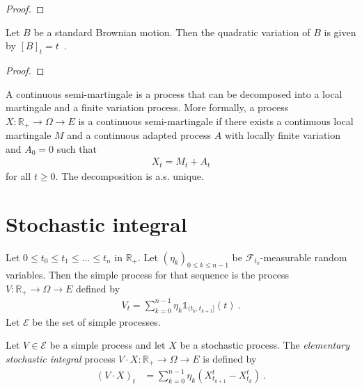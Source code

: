 \begin{proof}

\end{proof}


\begin{lemma}\label{lem:quadraticVariation_brownian}
Let $B$ be a standard Brownian motion. Then the quadratic variation of $B$ is given by $[B]_t = t$~.
\end{lemma}

\begin{proof}

\end{proof}


\begin{definition}\label{def:continuousSemiMartingale}
A continuous semi-martingale is a process that can be decomposed into a local martingale and a finite variation process.
More formally, a process $X : \mathbb{R}_+ \to \Omega \to E$ is a continuous semi-martingale if there exists a continuous local martingale $M$ and a continuous adapted process $A$ with locally finite variation and $A_0 = 0$ such that
\begin{align*}
  X_t = M_t + A_t
\end{align*}
for all $t \ge 0$.
The decomposition is a.s. unique.
\end{definition}


\section{Stochastic integral}


\begin{definition}\label{def:simpleProcess}
Let $0 \le t_0 \le t_1 \le \ldots \le t_n$ in $\mathbb{R}_+$.
Let $(\eta_k)_{0 \le k \le n-1}$ be $\mathcal{F}_{t_k}$-measurable random variables.
Then the simple process for that sequence is the process $V : \mathbb{R}_+ \to \Omega \to E$ defined by
\begin{align*}
  V_t = \sum_{k=0}^{n-1} \eta_k \mathbb{1}_{(t_k, t_{k+1}]}(t)
  \: .
\end{align*}
Let $\mathcal{E}$ be the set of simple processes.
\end{definition}


\begin{definition}\label{def:elemStochIntegral}
Let $V \in \mathcal{E}$ be a simple process and let $X$ be a stochastic process.
The \emph{elementary stochastic integral} process $V \cdot X : \mathbb{R}_+ \to \Omega \to E$ is defined by
\begin{align*}
  (V \cdot X)_t
  &= \sum_{k=0}^{n-1} \eta_k (X^t_{t_{k+1}} - X^t_{t_k})
  \: .
\end{align*}
\end{definition}


